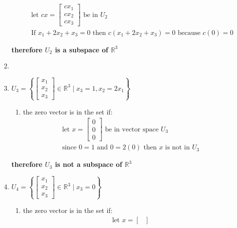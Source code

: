 \documentclass[11pt]{article}
\begin{document}
\begin{enumerate}
\begin{enumerate}
\begin{enumerate}
\[\begin{aligned}
            &\text{let } cx = \begin{bmatrix}
                cx_1 \\
                cx_2 \\
                cx_3
            \end{bmatrix} \text{ be in } U_2 \\
            &\text{If } x_1 + 2x_2 + x_3 = 0 \text{ then } c(x_1 + 2x_2 + x_3) = 0 \text{ because } c(0) = 0
        \end{aligned}
        \]
    \end{enumerate}
    \textbf{therefore \( U_2 \) is a subspace of \( \mathbb{R}^3 \)}
    \item \item \( U_3 = \left\{ \begin{bmatrix}
        x_1 \\
        x_2 \\
        x_3
        \end{bmatrix} \in \mathbb{R}^3 \mid x_3 = 1, x_2 = 2x_1 \right\} \)
    \begin{enumerate}
        \item the zero vector is in the set if:
        \[
        \begin{aligned}
            &\text{let } x = \begin{bmatrix}
                0 \\
                0 \\
                0
            \end{bmatrix} \text{ be in vector space } U_3 \\
            &\text{since } 0 = 1 \text{ and } 0 = 2(0) \text{ then } x \text{ is not in } U_3
        \end{aligned}
        \]
    \end{enumerate}
    \textbf{therefore \( U_3 \) is not a subspace of \( \mathbb{R}^3 \)}
    \item \( U_4 = \left\{ \begin{bmatrix}
    x_1 \\
    x_2 \\
    x_3
    \end{bmatrix} \in \mathbb{R}^3 \mid x_3 = 0 \right\} \)
    \begin{enumerate}
        \item the zero vector is in the set if:
        \[
        \begin{aligned}
            &\text{let } x = \begin{bmatrix}

\end{bmatrix}
\end{aligned}\]
\end{enumerate}
\end{enumerate}
\end{enumerate}
\end{document}
